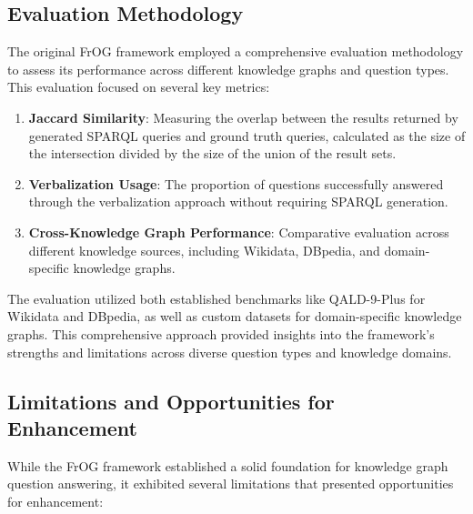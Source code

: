 \subsection{Evaluation Methodology}
\label{sec:frog-evaluation}
The original FrOG framework employed a comprehensive evaluation methodology to assess its performance across different knowledge graphs and question types. This evaluation focused on several key metrics:

\begin{enumerate}
    \item \textbf{Jaccard Similarity}: Measuring the overlap between the results returned by generated SPARQL queries and ground truth queries, calculated as the size of the intersection divided by the size of the union of the result sets.
    
    \item \textbf{Verbalization Usage}: The proportion of questions successfully answered through the verbalization approach without requiring SPARQL generation.
    
    \item \textbf{Cross-Knowledge Graph Performance}: Comparative evaluation across different knowledge sources, including Wikidata, DBpedia, and domain-specific knowledge graphs.
\end{enumerate}

The evaluation utilized both established benchmarks like QALD-9-Plus \citep{perevalov2022qald9plus} for Wikidata and DBpedia, as well as custom datasets for domain-specific knowledge graphs. This comprehensive approach provided insights into the framework's strengths and limitations across diverse question types and knowledge domains.

\subsection{Limitations and Opportunities for Enhancement}
\label{sec:frog-limitations}
While the FrOG framework established a solid foundation for knowledge graph question answering, it exhibited several limitations that presented opportunities for enhancement:


